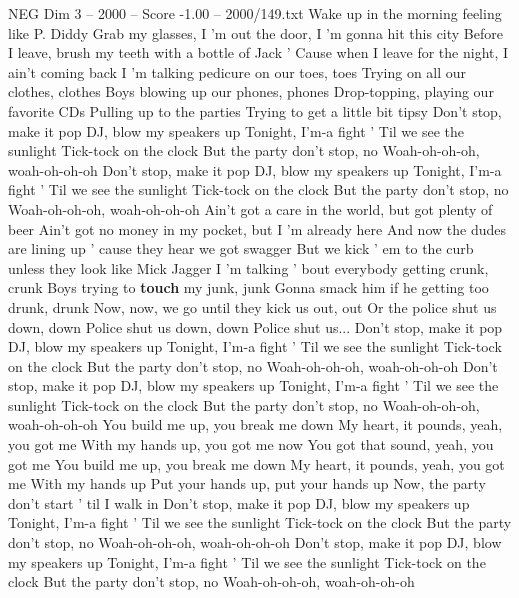 \begin{textsample}{NEG Dim 3 – 2000 – Score -1.00 – 2000/149.txt}  \label{ex:f3_neg_017}
Wake up in the morning feeling like P.
Diddy Grab my glasses, I 'm out the door, I 'm gonna hit this city Before I leave, brush my teeth with a bottle of Jack ' Cause when I leave for the night, I ain't coming back I 'm talking pedicure on our toes, toes Trying on all our clothes, clothes Boys blowing up our phones, phones Drop-topping, playing our favorite CDs Pulling up to the parties Trying to get a little bit tipsy Don't stop, make it pop DJ, blow my speakers up Tonight, I'm-a fight ' Til we see the sunlight Tick-tock on the clock But the party don't stop, no Woah-oh-oh-oh, woah-oh-oh-oh Don't stop, make it pop DJ, blow my speakers up Tonight, I'm-a fight ' Til we see the sunlight Tick-tock on the clock But the party don't stop, no Woah-oh-oh-oh, woah-oh-oh-oh Ain't got a care in the world, but got plenty of beer Ain't got no money in my pocket, but I 'm already here And now the dudes are lining up ' cause they hear we got swagger But we kick ' em to the curb unless they look like Mick Jagger I 'm talking ' bout everybody getting crunk, crunk Boys trying to \textbf{touch} my junk, junk Gonna smack him if he getting too drunk, drunk Now, now, we go until they kick us out, out Or the police shut us down, down Police shut us down, down Police shut us...
Don't stop, make it pop DJ, blow my speakers up Tonight, I'm-a fight ' Til we see the sunlight Tick-tock on the clock But the party don't stop, no Woah-oh-oh-oh, woah-oh-oh-oh Don't stop, make it pop DJ, blow my speakers up Tonight, I'm-a fight ' Til we see the sunlight Tick-tock on the clock But the party don't stop, no Woah-oh-oh-oh, woah-oh-oh-oh You build me up, you break me down My heart, it pounds, yeah, you got me With my hands up, you got me now You got that sound, yeah, you got me You build me up, you break me down My heart, it pounds, yeah, you got me With my hands up Put your hands up, put your hands up Now, the party don't start ' til I walk in Don't stop, make it pop DJ, blow my speakers up Tonight, I'm-a fight ' Til we see the sunlight Tick-tock on the clock But the party don't stop, no Woah-oh-oh-oh, woah-oh-oh-oh Don't stop, make it pop DJ, blow my speakers up Tonight, I'm-a fight ' Til we see the sunlight Tick-tock on the clock But the party don't stop, no Woah-oh-oh-oh, woah-oh-oh-oh

\end{textsample}
